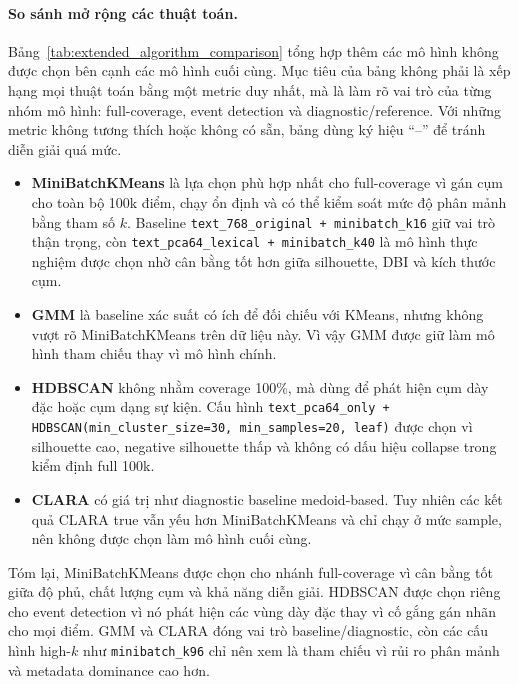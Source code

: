 \paragraph{So sánh mở rộng các thuật toán.}
Bảng~\ref{tab:extended_algorithm_comparison} tổng hợp thêm các mô hình không được chọn bên cạnh các mô hình cuối cùng. Mục tiêu của bảng không phải là xếp hạng mọi thuật toán bằng một metric duy nhất, mà là làm rõ vai trò của từng nhóm mô hình: full-coverage, event detection và diagnostic/reference. Với những metric không tương thích hoặc không có sẵn, bảng dùng ký hiệu ``--'' để tránh diễn giải quá mức.

\begin{itemize}
    \item \textbf{MiniBatchKMeans} là lựa chọn phù hợp nhất cho full-coverage vì gán cụm cho toàn bộ 100k điểm, chạy ổn định và có thể kiểm soát mức độ phân mảnh bằng tham số $k$. Baseline \texttt{text\_768\_original + minibatch\_k16} giữ vai trò thận trọng, còn \texttt{text\_pca64\_lexical + minibatch\_k40} là mô hình thực nghiệm được chọn nhờ cân bằng tốt hơn giữa silhouette, DBI và kích thước cụm.
    \item \textbf{GMM} là baseline xác suất có ích để đối chiếu với KMeans, nhưng không vượt rõ MiniBatchKMeans trên dữ liệu này. Vì vậy GMM được giữ làm mô hình tham chiếu thay vì mô hình chính.
    \item \textbf{HDBSCAN} không nhằm coverage 100\%, mà dùng để phát hiện cụm dày đặc hoặc cụm dạng sự kiện. Cấu hình \texttt{text\_pca64\_only + HDBSCAN(min\_cluster\_size=30, min\_samples=20, leaf)} được chọn vì silhouette cao, negative silhouette thấp và không có dấu hiệu collapse trong kiểm định full 100k.
    \item \textbf{CLARA} có giá trị như diagnostic baseline medoid-based. Tuy nhiên các kết quả CLARA true vẫn yếu hơn MiniBatchKMeans và chỉ chạy ở mức sample, nên không được chọn làm mô hình cuối cùng.
\end{itemize}

Tóm lại, MiniBatchKMeans được chọn cho nhánh full-coverage vì cân bằng tốt giữa độ phủ, chất lượng cụm và khả năng diễn giải. HDBSCAN được chọn riêng cho event detection vì nó phát hiện các vùng dày đặc thay vì cố gắng gán nhãn cho mọi điểm. GMM và CLARA đóng vai trò baseline/diagnostic, còn các cấu hình high-$k$ như \texttt{minibatch\_k96} chỉ nên xem là tham chiếu vì rủi ro phân mảnh và metadata dominance cao hơn.
